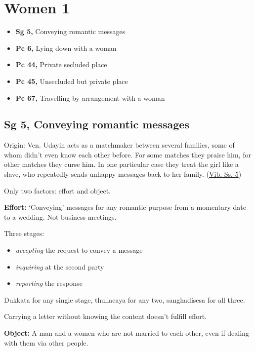 \chapter{Women 1}

\begin{itemize}
\tightlist
\item
  \textbf{Sg 5,} Conveying romantic messages
\item
  \textbf{Pc 6,} Lying down with a woman
\item
  \textbf{Pc 44,} Private secluded place
\item
  \textbf{Pc 45,} Unsecluded but private place
\item
  \textbf{Pc 67,} Travelling by arrangement with a woman
\end{itemize}


\section{Sg 5, Conveying romantic messages}

Origin: Ven. Udayin acts as a matchmaker between several families, some
of whom didn't even know each other before. For some matches they praise
him, for other matches they curse him. In one particular case they treat
the girl like a slave, who repeatedly sends unhappy messages back to her
family.
(\href{https://suttacentral.net/pli-tv-bu-vb-ss5/en/brahmali}{Vib. Ss.
5})

Only two factors: effort and object.

\textbf{Effort:} `Conveying' messages for any romantic purpose from a
momentary date to a wedding. Not business meetings.

Three stages:

\begin{itemize}
\tightlist
\item
  \emph{accepting} the request to convey a message
\item
  \emph{inquiring} at the second party
\item
  \emph{reporting} the response
\end{itemize}

Dukkata for any single stage, thullacaya for any two, sanghadisesa for
all three.

Carrying a letter without knowing the content doesn't fulfill effort.

\textbf{Object:} A man and a women who are not married to each other,
even if dealing with them via other people.

